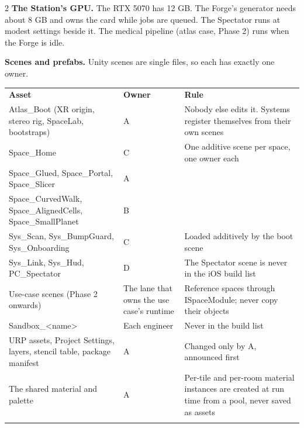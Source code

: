 \documentclass[10pt,a4paper,landscape]{article}
\newcommand{\code}[1]{{\ttfamily #1}}
\newcommand{\tablefont}{\fontsize{8}{10.6}\selectfont}
\newcommand{\thinrule}{\arrayrulecolor{rule}\hline}
\newcommand{\thickrule}{\arrayrulecolor{ink}\hline}
\begin{document}
\begin{multicols}{2}
\textbf{The Station's GPU.} The RTX 5070 has 12 GB. The Forge's generator needs about 8 GB and owns the card while jobs are queued. The Spectator runs at modest settings beside it. The medical pipeline (\code{atlas case}, Phase 2) runs when the Forge is idle.\par

\textbf{Scenes and prefabs.} Unity scenes are single files, so each has exactly one owner.\par

{\tablefont\renewcommand{\arraystretch}{1.3}\setlength{\tabcolsep}{2mm}\begin{tabularx}{\linewidth}{@{}>{\RaggedRight\arraybackslash}X >{\RaggedRight\arraybackslash}X >{\RaggedRight\arraybackslash}X@{}}
\rowcolor{panel}\textbf{Asset} & \textbf{Owner} & \textbf{Rule} \\ \thickrule
\code{Atlas\_\allowbreak{}Boot} (XR origin, stereo rig, SpaceLab, bootstraps) & A & Nobody else edits it. Systems register themselves from their own scenes \\ \thinrule
\code{Space\_\allowbreak{}Home} & C & One additive scene per space, one owner each \\ \thinrule
\code{Space\_\allowbreak{}Glued}, \code{Space\_\allowbreak{}Portal}, \code{Space\_\allowbreak{}Slicer} & A &  \\ \thinrule
\code{Space\_\allowbreak{}CurvedWalk}, \code{Space\_\allowbreak{}AlignedCells}, \code{Space\_\allowbreak{}SmallPlanet} & B &  \\ \thinrule
\code{Sys\_\allowbreak{}Scan}, \code{Sys\_\allowbreak{}BumpGuard}, \code{Sys\_\allowbreak{}Onboarding} & C & Loaded additively by the boot scene \\ \thinrule
\code{Sys\_\allowbreak{}Link}, \code{Sys\_\allowbreak{}Hud}, \code{PC\_\allowbreak{}Spectator} & D & The Spectator scene is never in the iOS build list \\ \thinrule
Use-case scenes (Phase 2 onwards) & The lane that owns the use case's runtime & Reference spaces through \code{ISpaceModule}; never copy their objects \\ \thinrule
\code{Sandbox\_\allowbreak{}\textless{}name\textgreater{}} & Each engineer & Never in the build list \\ \thinrule
URP assets, Project Settings, layers, stencil table, package manifest & A & Changed only by A, announced first \\ \thinrule
The shared material and palette & A & Per-tile and per-room material instances are created at run time from a pool, never saved as assets \\ \thinrule
\end{tabularx}\par}


\end{multicols}
\end{document}
